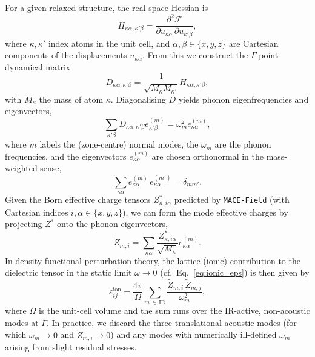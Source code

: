 \documentclass[aps,physrev,graphicx,amsmath,amssymb,
               reprint,superscriptaddress]{revtex4-2}
\begin{document}
For a given relaxed structure, the real-space Hessian is
\begin{equation}
  H_{\kappa\alpha,\kappa'\beta} = \frac{\partial^2 \mathcal{F}}{\partial u_{\kappa\alpha}\,\partial u_{\kappa'\beta}} ,
\end{equation}
where $\kappa,\kappa'$ index atoms in the unit cell, and $\alpha,\beta\in\{x,y,z\}$ are Cartesian components of the displacements $u_{\kappa\alpha}$. From this we construct the $\Gamma$-point dynamical matrix
\begin{equation}
  D_{\kappa\alpha,\kappa'\beta} = \frac{1}{\sqrt{M_\kappa M_{\kappa'}}} H_{\kappa\alpha,\kappa'\beta},
\end{equation}
with $M_\kappa$ the mass of atom $\kappa$. Diagonalising $D$ yields phonon eigenfrequencies and eigenvectors,
\begin{equation}
  \sum_{\kappa'\beta} D_{\kappa\alpha,\kappa'\beta} e^{(m)}_{\kappa'\beta} = \omega_m^2 e^{(m)}_{\kappa\alpha} ,
\end{equation}
where $m$ labels the (zone-centre) normal modes, the $\omega_m$ are the phonon frequencies, and the eigenvectors $e^{(m)}_{\kappa\alpha}$ are chosen orthonormal in the mass-weighted sense,
\begin{equation}
  \sum_{\kappa\alpha} e^{(m)}_{\kappa\alpha}\,e^{(m')}_{\kappa\alpha} = \delta_{mm'} .
\end{equation}
Given the Born effective charge tensors $Z^{\ast}_{\kappa,i\alpha}$ predicted by \texttt{MACE-Field} (with Cartesian indices $i,\alpha\in\{x,y,z\}$), we can form the mode effective charges by projecting $Z^*$ onto the phonon eigenvectors,
\begin{equation}
  \tilde{Z}_{m,i} = \sum_{\kappa\alpha} \frac{Z^{\ast}_{\kappa,i\alpha}}{\sqrt{M_\kappa}} e^{(m)}_{\kappa\alpha} .
\end{equation}
In density-functional perturbation theory, the lattice (ionic) contribution to the dielectric tensor in the static limit $\omega\to 0$ (cf.\ Eq.~\eqref{eq:ionic_eps}) is then given by
\begin{equation}
  \varepsilon^{\mathrm{ion}}_{ij} = \frac{4\pi}{\Omega} \sum_{m\,\in\,\mathrm{IR}} \frac{\tilde{Z}_{m,i}\,\tilde{Z}_{m,j}}{\omega_m^2} ,
  \label{eq:eps_ion_static}
\end{equation}
where $\Omega$ is the unit-cell volume and the sum runs over the IR-active, non-acoustic modes at $\Gamma$. In practice, we discard the three translational acoustic modes (for which $\omega_m\to 0$ and $\tilde{Z}_{m,i}\to 0$) and any modes with numerically ill-defined $\omega_m$ arising from slight residual stresses.
\end{document}
